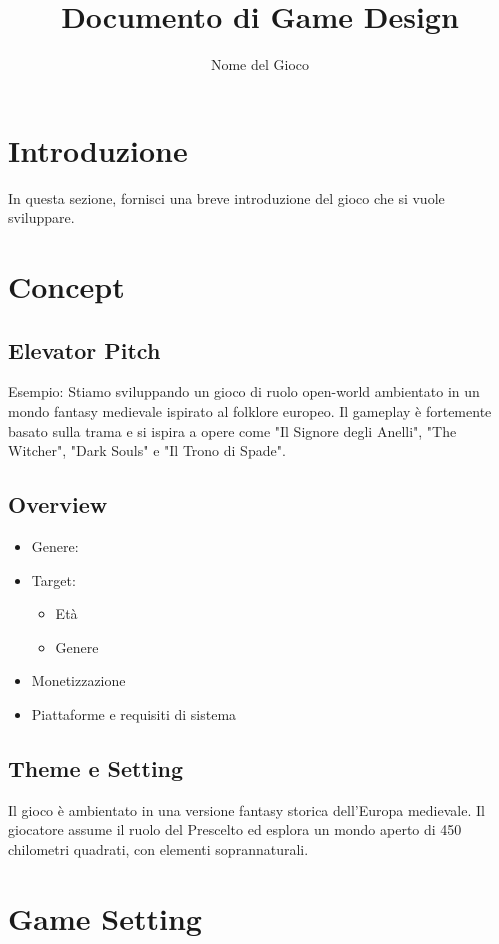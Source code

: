 \documentclass{report}
\title{Documento di Game Design}
\author{Nome del Gioco}
\begin{document}
\maketitle

\section{Introduzione}
In questa sezione, fornisci una breve introduzione del gioco che si vuole sviluppare.

\section{Concept}

\subsection{Elevator Pitch}
Esempio: Stiamo sviluppando un gioco di ruolo open-world ambientato in un mondo fantasy medievale ispirato al folklore europeo. Il gameplay è fortemente basato sulla trama e si ispira a opere come "Il Signore degli Anelli", "The Witcher", "Dark Souls" e "Il Trono di Spade".

\subsection{Overview}
\begin{itemize}
  \item Genere: 
  \item Target:
  \begin{itemize}
    \item Età
    \item Genere
  \end{itemize}
  \item Monetizzazione
  \item Piattaforme e requisiti di sistema
\end{itemize}

\subsection{Theme e Setting}
Il gioco è ambientato in una versione fantasy storica dell'Europa medievale. Il giocatore assume il ruolo del Prescelto ed esplora un mondo aperto di 450 chilometri quadrati, con elementi soprannaturali.

\section{Game Setting}
\end{document}
